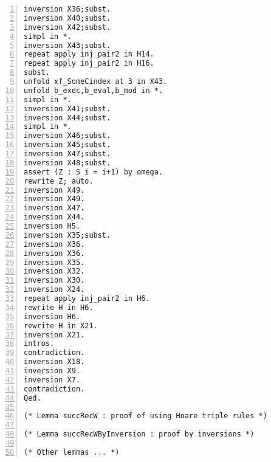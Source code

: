 \begin{appendices}
\begin{lstlisting}[caption = {Hoare\_getFstShadow.v file},xleftmargin=-.1\textwidth,
xrightmargin=-.1\textwidth,
mathescape=true,numbers=left]
inversion X36;subst.
inversion X40;subst.
inversion X42;subst.
simpl in *.
inversion X43;subst.
repeat apply inj_pair2 in H14.
repeat apply inj_pair2 in H16.
subst.
unfold xf_SomeCindex at 3 in X43.
unfold b_exec,b_eval,b_mod in *.
simpl in *.
inversion X41;subst.
inversion X44;subst.
simpl in *.
inversion X46;subst.
inversion X45;subst.
inversion X47;subst.
inversion X48;subst.
assert (Z : S i = i+1) by omega.
rewrite Z; auto.
inversion X49.
inversion X49.
inversion X47.
inversion X44.
inversion H5.
inversion X35;subst.
inversion X36.
inversion X36.
inversion X35.
inversion X32.
inversion X30.
inversion X24.
repeat apply inj_pair2 in H6.
rewrite H in H6.
inversion H6.
rewrite H in X21.
inversion X21.
intros.
contradiction.
inversion X18.
inversion X9.
inversion X7.
contradiction.
Qed.

(* Lemma succRecW : proof of using Hoare triple rules *)

(* Lemma succRecWByInversion : proof by inversions *)

(* Other lemmas ... *)

\end{lstlisting}

\end{appendices}




